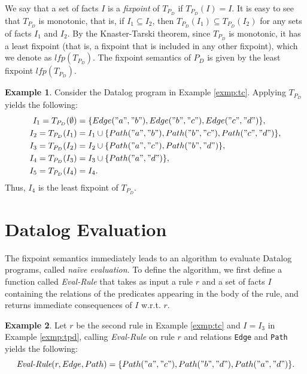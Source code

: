 \documentclass[11pt]{report}
\theoremstyle{definition}
\newtheorem{exmp}{Example}[chapter]
\begin{document}
We say that a set of facts $I$ is a \textit{fixpoint} of $T_{P_D}$ if $T_{P_D}(I) = I$. It is easy to see that $T_{P_D}$ is monotonic, that is, if $I_1 \subseteq I_2$, then $T_{P_D}(I_1) \subseteq T_{P_D}(I_2)$ for any sets of facts $I_1$ and $I_2$. By the Knaster-Tarski theorem, since $T_{P_D}$ is monotonic, it has a least fixpoint (that is, a fixpoint that is included in any other fixpoint), which we denote as $\textit{lfp}(T_{P_D})$. The fixpoint semantics of $P_D$ is given by the least fixpoint $\textit{lfp}(T_{P_D})$.

\begin{exmp}
  Consider the Datalog program in Example \ref{exmp:tc}. Applying $T_{P_D}$ yields the following:
  \begin{align*}
    I_1 = T_{P_D}(\emptyset) & = \{Edge("a", "b"), Edge("b", "c"), Edge("c", "d")\},          \\
    I_2 = T_{P_D}(I_1)       & = I_1 \cup \{Path("a", "b"), Path("b", "c"), Path("c", "d")\}, \\
    I_3 = T_{P_D}(I_2)       & = I_2 \cup \{Path("a", "c"), Path("b", "d")\},                 \\
    I_4 = T_{P_D}(I_3)       & = I_3 \cup \{Path("a", "d")\},                                 \\
    I_5 = T_{P_D}(I_4)       & = I_4.
  \end{align*}
  Thus, $I_4$ is the least fixpoint of $T_{P_D}$.
\end{exmp}
\label{exmp:tpd}

\section{Datalog Evaluation}

The fixpoint semantics immediately leads to an algorithm to evaluate Datalog programs, called \textit{naïve evaluation}. To define the algorithm, we first define a function called \textit{Eval-Rule} that takes as input a rule $r$ and a set of facts $I$ containing the relations of the predicates appearing in the body of the rule, and returns immediate consequences of $I$ w.r.t. $r$.

\begin{exmp}
  Let $r$ be the second rule in Example \ref{exmp:tc} and $I = I_3$ in Example \ref{exmp:tpd}, calling \textit{Eval-Rule} on rule $r$ and relations \texttt{Edge} and \texttt{Path} yields the following:
  $$
    \textit{Eval-Rule}(r, Edge, Path) = \{Path("a", "c"), Path("b", "d"), Path("a", "d")\}.
  $$
\end{exmp}
\label{exmp:eval-rule}
\end{document}
